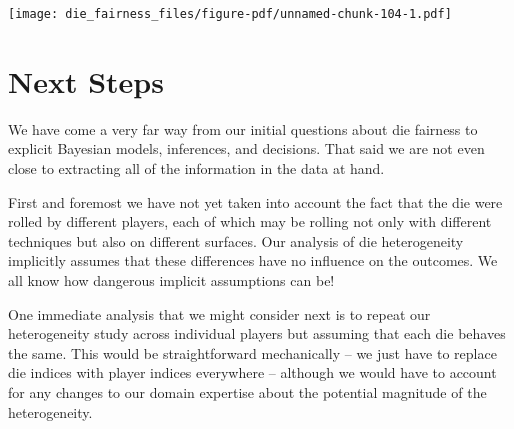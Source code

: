 \documentclass[
  letterpaper,
  DIV=11,
  numbers=noendperiod]{scrartcl}
\newenvironment{Shaded}{\begin{snugshade}}{\end{snugshade}}
\newcommand{\AttributeTok}[1]{\textcolor[rgb]{0.40,0.45,0.13}{#1}}
\newcommand{\ControlFlowTok}[1]{\textcolor[rgb]{0.00,0.23,0.31}{#1}}
\newcommand{\DecValTok}[1]{\textcolor[rgb]{0.68,0.00,0.00}{#1}}
\newcommand{\FloatTok}[1]{\textcolor[rgb]{0.68,0.00,0.00}{#1}}
\newcommand{\FunctionTok}[1]{\textcolor[rgb]{0.28,0.35,0.67}{#1}}
\newcommand{\NormalTok}[1]{\textcolor[rgb]{0.00,0.23,0.31}{#1}}
\newcommand{\OtherTok}[1]{\textcolor[rgb]{0.00,0.23,0.31}{#1}}
\newcommand{\SpecialCharTok}[1]{\textcolor[rgb]{0.37,0.37,0.37}{#1}}
\newcommand{\StringTok}[1]{\textcolor[rgb]{0.13,0.47,0.30}{#1}}
\begin{document}
\begin{Shaded}
\end{Shaded}

\texttt{[image: die\_fairness\_files/figure-pdf/unnamed-chunk-104-1.pdf]}

\section{Next Steps}\label{next-steps}

We have come a very far way from our initial questions about die
fairness to explicit Bayesian models, inferences, and decisions. That
said we are not even close to extracting all of the information in the
data at hand.

First and foremost we have not yet taken into account the fact that the
die were rolled by different players, each of which may be rolling not
only with different techniques but also on different surfaces. Our
analysis of die heterogeneity implicitly assumes that these differences
have no influence on the outcomes. We all know how dangerous implicit
assumptions can be!

One immediate analysis that we might consider next is to repeat our
heterogeneity study across individual players but assuming that each die
behaves the same. This would be straightforward mechanically -- we just
have to replace die indices with player indices everywhere -- although
we would have to account for any changes to our domain expertise about
the potential magnitude of the heterogeneity.
\end{document}

